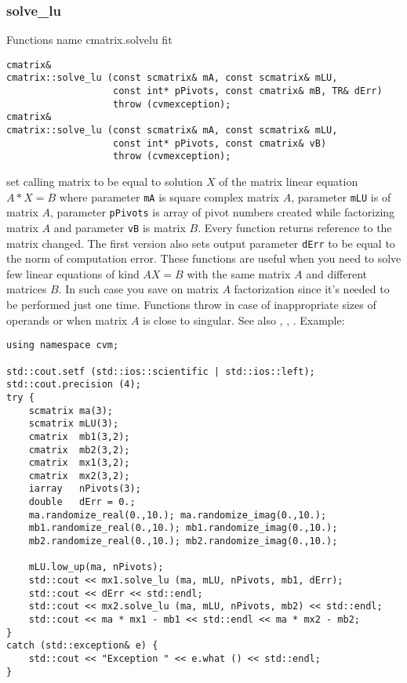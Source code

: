 \subsubsection{solve\_lu}
Functions%
\pdfdest name {cmatrix.solvelu} fit
\begin{verbatim}
cmatrix&
cmatrix::solve_lu (const scmatrix& mA, const scmatrix& mLU,
                   const int* pPivots, const cmatrix& mB, TR& dErr)
                   throw (cvmexception);
cmatrix&
cmatrix::solve_lu (const scmatrix& mA, const scmatrix& mLU,
                   const int* pPivots, const cmatrix& vB)
                   throw (cvmexception);
\end{verbatim}
set  calling matrix to be equal to solution $X$ of the
matrix linear equation
$A*X=B$ where  parameter \verb"mA" is  square complex matrix $A$,
parameter \verb"mLU" is 
of  matrix $A$, parameter \verb"pPivots" is  array of pivot numbers
created while factorizing  matrix $A$
and  parameter \verb"vB" is  matrix $B$.
Every function returns  reference to the matrix changed.
The first version also sets output parameter \verb"dErr" to be equal
to the norm of computation error.
These functions are useful when you need to solve few linear equations
of kind $AX=B$ with the same matrix $A$ and different matrices $B$.
In such case you save on matrix $A$ factorization since it's needed to be
performed just one time.
Functions throw 
in case of inappropriate sizes
of operands or when  matrix $A$ is close to singular.
See also
,
,
.
Example:
\begin{Verbatim}
using namespace cvm;

std::cout.setf (std::ios::scientific | std::ios::left); 
std::cout.precision (4);
try {
    scmatrix ma(3);
    scmatrix mLU(3);
    cmatrix  mb1(3,2);
    cmatrix  mb2(3,2);
    cmatrix  mx1(3,2);
    cmatrix  mx2(3,2);
    iarray   nPivots(3);
    double   dErr = 0.;
    ma.randomize_real(0.,10.); ma.randomize_imag(0.,10.);
    mb1.randomize_real(0.,10.); mb1.randomize_imag(0.,10.);
    mb2.randomize_real(0.,10.); mb2.randomize_imag(0.,10.);

    mLU.low_up(ma, nPivots);
    std::cout << mx1.solve_lu (ma, mLU, nPivots, mb1, dErr);
    std::cout << dErr << std::endl;
    std::cout << mx2.solve_lu (ma, mLU, nPivots, mb2) << std::endl;
    std::cout << ma * mx1 - mb1 << std::endl << ma * mx2 - mb2;
}
catch (std::exception& e) {
    std::cout << "Exception " << e.what () << std::endl;
}
\end{Verbatim}
